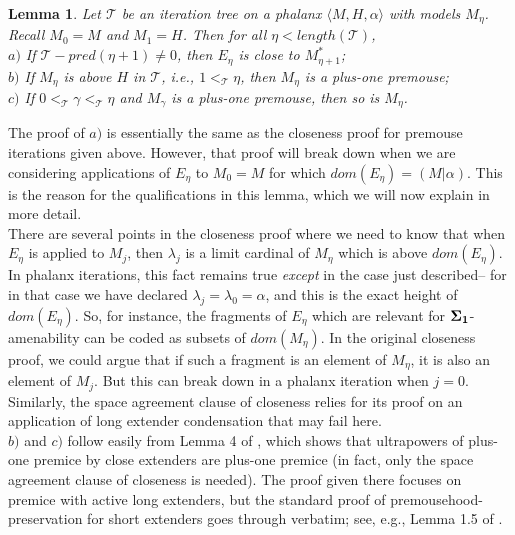 \documentclass[12pt]{article}
\newtheorem{lem}[thm]{Lemma}
\begin{document}
\begin{lem}
Let $\mathscr{T}$ be an iteration tree on a phalanx $\langle M, H, \alpha \rangle$ with models $M_\eta$.  Recall $M_0 = M$ and $M_1 = H$.  Then for all $\eta < length ( \mathscr{T} )$,\\

\indent $a)$ If $\mathscr{T}-pred ( \eta + 1 ) \neq 0$, then $E_\eta$ is close to $M_{\eta + 1}^*$;\\

\indent $b)$ If $M_\eta$ is above $H$ in $\mathscr{T}$, i.e., $1 <_\mathscr{T} \eta$, then $M_\eta$ is a plus-one premouse;\\

\indent $c)$ If $0 <_\mathscr{T} \gamma <_\mathscr{T} \eta$ and $M_\gamma$ is a plus-one premouse, then so is $M_\eta$.
\end{lem}

The proof of $a)$ is essentially the same as the closeness proof for premouse iterations given above.   However, that proof will break down when we are considering applications of $E_\eta$ to $M_0 = M$ for which $dom( E_\eta ) = (M | \alpha )$.  This is the reason for the qualifications in this lemma, which we will now explain in more detail.\\

There are several points in the closeness proof where we need to know that when $E_\eta$ is applied to $M_j$, then $\lambda_j$ is a limit cardinal of $M_\eta$ which is above $dom ( E_\eta )$.  In phalanx iterations, this fact remains true \textit{except} in the case just described-- for in that case we have declared $\lambda_j = \lambda_0 = \alpha$, and this is the exact height of $dom (E_\eta )$.  So, for instance, the fragments of $E_\eta$ which are relevant for $\bf{\Sigma}_1$-amenability can be coded as subsets of $dom ( M_\eta )$.  In the original closeness proof, we could argue that if such a fragment is an element of $M_\eta$, it is also an element of $M_j$.  But this can break down in a phalanx iteration when $j = 0$.  Similarly, the space agreement clause of closeness relies for its proof on an application of long extender condensation that may fail here. \\

$b)$ and $c)$ follow easily from Lemma 4 of \cite{PIPM}, which shows that ultrapowers of plus-one premice by close extenders are plus-one premice (in fact, only the space agreement clause of closeness is needed).  The proof given there focuses on premice with active long extenders, but the standard proof of premousehood-preservation for short extenders goes through verbatim; see, e.g., Lemma 1.5 of \cite{zeman square proof}.  \\
\end{document}
